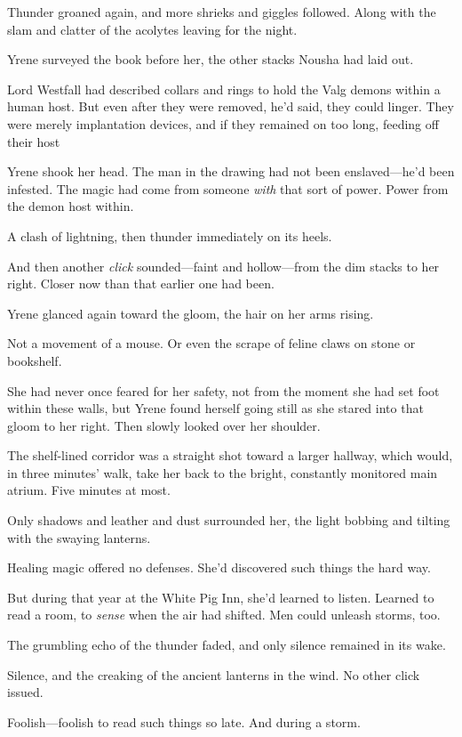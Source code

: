 Thunder groaned again, and more shrieks and giggles followed. Along with the slam and clatter of the acolytes leaving for the night.

Yrene surveyed the book before her, the other stacks Nousha had laid out.

Lord Westfall had described collars and rings to hold the Valg demons within a human host. But even after they were removed, he'd said, they could linger. They were merely implantation devices, and if they remained on too long, feeding off their host 

Yrene shook her head. The man in the drawing had not been enslaved---he'd been infested. The magic had come from someone
\emph{with} that sort of power. Power from the demon host within.

A clash of lightning, then thunder immediately on its heels.

And then another \emph{click} sounded---faint and hollow---from the dim stacks to her right. Closer now than that earlier one had been.

Yrene glanced again toward the gloom, the hair on her arms rising.

Not a movement of a mouse. Or even the scrape of feline claws on stone or bookshelf.

She had never once feared for her safety, not from the moment she had set foot within these walls, but Yrene found herself going still as she stared into that gloom to her right. Then slowly looked over her shoulder.

The shelf-lined corridor was a straight shot toward a larger hallway, which would, in three minutes' walk, take her back to the bright, constantly monitored main atrium. Five minutes at most.

Only shadows and leather and dust surrounded her, the light bobbing and tilting with the swaying lanterns.

Healing magic offered no defenses. She'd discovered such things the hard way.

But during that year at the White Pig Inn, she'd learned to listen. Learned to read a room, to \emph{sense} when the air had shifted. Men could unleash storms, too.

The grumbling echo of the thunder faded, and only silence remained in its wake.

Silence, and the creaking of the ancient lanterns in the wind. No other click issued.

Foolish---foolish to read such things so late. And during a storm.

